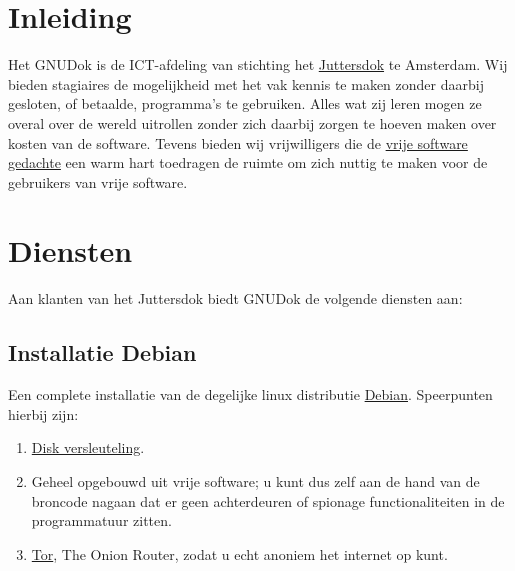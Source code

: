
\section{Inleiding}

Het GNUDok is de ICT-afdeling van stichting het \href{http://www.juttersdok.nl/}{Juttersdok} te Amsterdam. Wij bieden stagiaires de mogelijkheid met het vak kennis te maken zonder daarbij gesloten, of betaalde, programma's te gebruiken. Alles wat zij leren mogen ze overal over de wereld uitrollen zonder zich daarbij zorgen te hoeven maken over kosten van de software. Tevens bieden wij vrijwilligers die de \href{http://www.fsf.org/}{vrije software gedachte} een warm hart toedragen de ruimte om zich nuttig te maken voor de gebruikers van vrije software.

\section{Diensten}

Aan klanten van het Juttersdok biedt GNUDok de volgende diensten aan:

\subsection{Installatie Debian}

Een complete installatie van de degelijke linux distributie \href{https://www.debian.org/}{Debian}.
Speerpunten hierbij zijn:

\begin{enumerate}
	\item \href{https://wiki.archlinux.org/index.php/Disk_encryption}{Disk versleuteling}.
		\item Geheel opgebouwd uit vrije software; u kunt dus zelf aan de hand van de broncode nagaan dat er geen achterdeuren of spionage functionaliteiten in de programmatuur zitten.
		\item \href{https://www.torproject.org}{Tor}, The Onion Router, zodat u echt anoniem het internet op kunt.
\end{enumerate}


